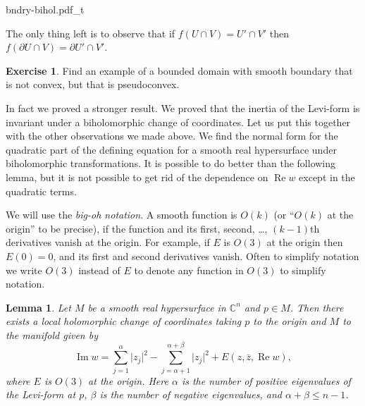\documentclass[12pt,openany]{book}
\renewcommand{\Re}{\operatorname{Re}}
\renewcommand{\Im}{\operatorname{Im}}
\newcommand{\sabs}[1]{\lvert {#1} \rvert}
\newcommand{\C}{{\mathbb{C}}}
\newcommand{\myindex}[1]{#1\index{#1}}
\theoremstyle{plain}
\newtheorem{lemma}[thm]{Lemma}
\theoremstyle{remark}
\theoremstyle{definition}
\newenvironment{exbox}{%
    \def\FrameCommand{\vrule width 1pt \relax\hspace {10pt}}%
    \MakeFramed {\advance \hsize -\width \FrameRestore }%
}{%
    \endMakeFramed
}
\theoremstyle{exercise}
\newtheorem{exercise}{Exercise}[section]
\theoremstyle{example}
\begin{document}
\begin{center}
{bndry-bihol.pdf_t}
\end{center}

The only thing left is to observe that if
$f(U \cap V) = U' \cap V'$ then $f(\partial U \cap V) = \partial U' \cap
V'$.

\begin{exbox}
\begin{exercise}
Find an example of a bounded domain with smooth boundary that is not convex,
but that is pseudoconvex.
\end{exercise}
\end{exbox}

In fact we proved a stronger result.  We proved that the inertia
of the Levi-form is invariant under a biholomorphic change of coordinates.
Let us put this together with the other observations we made above.
We find the normal form for the
quadratic part of the defining equation for a smooth real hypersurface under biholomorphic transformations.
It is possible to do better than the following lemma, but it is not possible
to get rid of the dependence on $\Re w$ except in the quadratic
terms.

We will use the \emph{\myindex{big-oh notation}}.
A smooth function is $O(k)$ (or ``$O(k)$ at the origin'' to be
precise), if
the function and its first, second, \ldots, $(k-1)$th
derivatives vanish at the origin.
For example, if $E$ is $O(3)$ at the origin
then $E(0)=0$, and its first and second derivatives vanish.
Often to simplify notation we write
$O(3)$ instead of $E$ to denote any function in $O(3)$ to simplify notation.

\begin{lemma} \label{lemma:normformquad}
Let $M$ be a smooth real hypersurface in $\C^n$ and $p \in M$.  Then there
exists a local holomorphic change of coordinates taking $p$ to the origin
and $M$ to the manifold given by
\begin{equation*}
\Im w = \sum_{j=1}^\alpha \sabs{z_j}^2 - \sum_{j=\alpha+1}^{\alpha+\beta}
\sabs{z_j}^2 +
E(z,\bar{z},\Re w) ,
\end{equation*}
where $E$ is $O(3)$ at the origin.
Here $\alpha$ is the number of positive eigenvalues of the Levi-form at $p$,
$\beta$ is the number of negative eigenvalues, and $\alpha+\beta \leq
n-1$.
\end{lemma}

\end{document}
